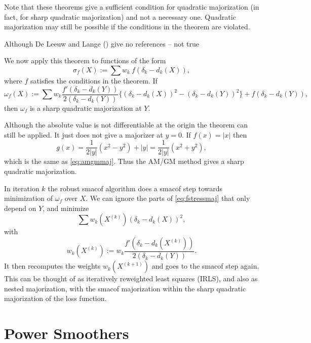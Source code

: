 \documentclass[
  12pt,
  letterpaper,
  DIV=11,
  numbers=noendperiod]{scrartcl}
\newcommand{\sectionbreak}{\pagebreak}
\begin{document}
Note that these theorems give a sufficient condition for quadratic
majorization (in fact, for sharp quadratic majorization) and not a
necessary one. Quadratic majorization may still be possible if the
conditions in the theorem are violated.

Although De Leeuw and Lange ()
give no references -- not true

We now apply this theorem to functions of the form \begin{equation}
\sigma_f(X):=\sum w_k\ f(\delta_k-d_k(X)),\label{eq:fstressdef}
\end{equation} where \(f\) satisfies the conditions in the theorem. If
\begin{equation}
\omega_f(X):=\sum w_k\frac{f'(\delta_k-d_k(Y))}{2(\delta_k-d_k(Y))}\{(\delta_k-d_k(X))^2-(\delta_k-d_k(Y))^2\}+f(\delta_k-d_k(Y)),\label{eq:fstressmaj}
\end{equation} then \(\omega_f\) is a sharp quadratic majorization at
\(Y\).

Although the absolute value is not differentiable at the origin the
theorem can still be applied. It just does not give a majorizer at
\(y=0\). If \(f(x)=|x|\) then \begin{equation}
g(x)=\frac{1}{2|y|}(x^2-y^2)+|y|=\frac{1}{2|y|}(x^2+y^2),\label{eq:abssharp}
\end{equation} which is the same as \eqref{eq:amgmmaj}. Thus the AM/GM
method gives a sharp quadratic majorization.

In iteration \(k\) the robust smacof algorithm does a smacof step
towards minimization of \(\omega_f\) over \(X\). We can ignore the parts
of \eqref{eq:fstressmaj} that only depend on \(Y\), and minimize
\begin{equation}
\sum w_k(X^{(k)})(\delta_k-d_k(X))^2,\label{eq:fstressaux}
\end{equation} with \begin{equation}
w_k(X^{(k)}):=w_k\frac{f'(\delta_k-d_k(X^{(k)}))}{2(\delta_k-d_k(Y))}.\label{eq:wkdef}
\end{equation} It then recomputes the weights \(w_k(X^{(k+1)})\) and
goes to the smacof step again. This can be thought of as iteratively
reweighted least squares (IRLS), and also as nested majorization, with
the smacof majorization within the sharp quadratic majorization of the
loss function.

\sectionbreak

\section{Power Smoothers}\label{power-smoothers}
\end{document}
